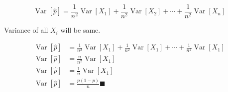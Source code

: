 \documentclass{article}
\theoremstyle{mytheoremstyle}
\theoremstyle{mytheoremstyle}
\theoremstyle{myproblemstyle}
\begin{document}
\[\operatorname{Var}[\hat{p}]=\frac{1}{n^2}\operatorname{Var}[X_1]+\frac{1}{n^2}\operatorname{Var}[X_2]+\cdots+\frac{1}{n^2}\operatorname{Var}[X_n]\]

Variance of all \(X_i\) will be same.

\begin{equation}
    \begin{split}
        \operatorname{Var}[\hat{p}]&=\frac{1}{n^2}\operatorname{Var}[X_1]+\frac{1}{n^2}\operatorname{Var}[X_1]+\cdots+\frac{1}{n^2}\operatorname{Var}[X_1]\\
        \operatorname{Var}[\hat{p}]&=\frac{n}{n^2}\operatorname{Var}[X_1]\\
        \operatorname{Var}[\hat{p}]&=\frac{1}{n}\operatorname{Var}[X_1]\\
        \operatorname{Var}[\hat{p}]&=\frac{p(1-p)}{n}\blacksquare
    \end{split}
\end{equation}
\end{document}
